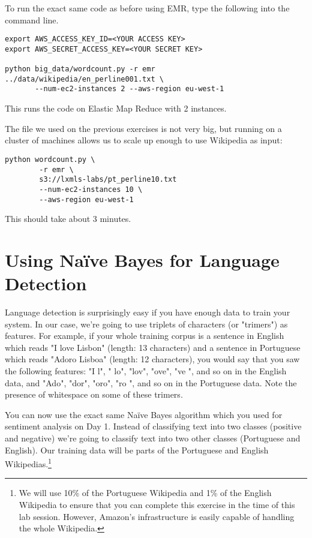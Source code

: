 To run the exact same code as before using EMR, type the following into the command line.

\begin{verbatim}
export AWS_ACCESS_KEY_ID=<YOUR ACCESS KEY>
export AWS_SECRET_ACCESS_KEY=<YOUR SECRET KEY>

python big_data/wordcount.py -r emr ../data/wikipedia/en_perline001.txt \
       --num-ec2-instances 2 --aws-region eu-west-1
\end{verbatim}

This runs the code on Elastic Map Reduce with 2 instances.

The file we used on the previous exercises is not very big, but running on a cluster of machines allows us to
scale up enough to use Wikipedia as input:

\begin{verbatim}
python wordcount.py \
        -r emr \
        s3://lxmls-labs/pt_perline10.txt
        --num-ec2-instances 10 \
        --aws-region eu-west-1
\end{verbatim}

This should take about 3 minutes.

\section{Using Na\"{i}ve Bayes for Language Detection}

Language detection is surprisingly easy if you have enough data to train your system. In our case, we're going to use triplets of characters (or "trimers") as features. For example, if your whole training corpus is a sentence in English which reads "I love Lisbon" (length: 13 characters) and a sentence in Portuguese which reads "Adoro Lisboa" (length: 12 characters), you would say that you saw the following features: "I l", " lo", "lov", "ove", "ve ", and so on in the English data, and "Ado", "dor", "oro", "ro ", and so on in the Portuguese data. Note the presence of whitespace on some of these trimers.

You can now use the exact same Na\"{i}ve Bayes algorithm which you used for sentiment analysis on Day 1. Instead of classifying text into two classes (positive and negative) we're going to classify text into two other classes (Portuguese and English). Our training data will be parts of the Portuguese and English Wikipedias.\footnote{We will use 10\% of the Portuguese Wikipedia and 1\% of the English Wikipedia to ensure that you can complete this exercise in the time of this lab session. However, Amazon's infrastructure is easily capable of handling the whole Wikipedia.}


